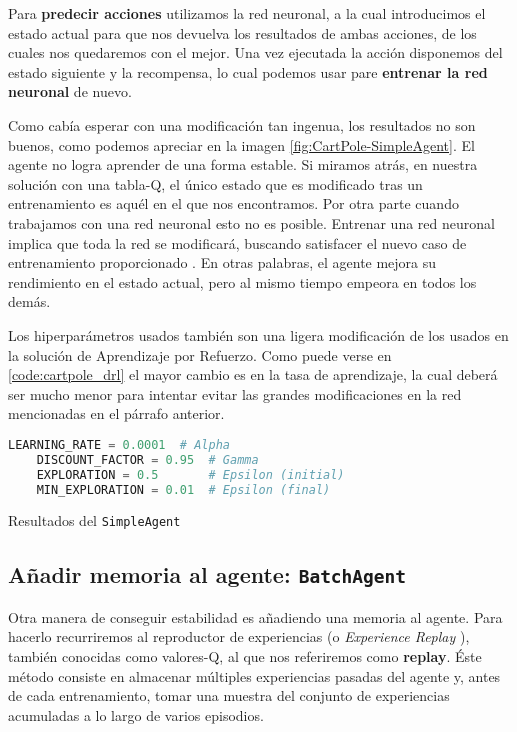 Para \textbf{predecir acciones} utilizamos la red neuronal, a la cual introducimos el estado actual para que nos devuelva los resultados de ambas acciones, de los cuales nos quedaremos con el mejor. Una vez ejecutada la acción disponemos del estado siguiente y la recompensa, lo cual podemos usar pare \textbf{entrenar la red neuronal} de nuevo.

Como cabía esperar con una modificación tan ingenua, los resultados no son buenos, como podemos apreciar en la imagen \ref{fig:CartPole-SimpleAgent}. El agente no logra aprender de una forma estable. Si miramos atrás, en nuestra solución con una tabla-Q, el único estado que es modificado tras un entrenamiento es aquél en el que nos encontramos. Por otra parte cuando trabajamos con una red neuronal esto no es posible. Entrenar una red neuronal implica que toda la red se modificará, buscando satisfacer el nuevo caso de entrenamiento proporcionado \citep{Buduma:backprop}. En otras palabras, el agente mejora su rendimiento en el estado actual, pero al mismo tiempo empeora en todos los demás.

Los hiperparámetros usados también son una ligera modificación de los usados en la solución de Aprendizaje por Refuerzo. Como puede verse en \ref{code:cartpole_drl} el mayor cambio es en la tasa de aprendizaje, la cual deberá ser mucho menor para intentar evitar las grandes modificaciones en la red mencionadas en el párrafo anterior.

\begin{minipage}{0.9\linewidth}%
    \begin{lstlisting}[frame=tb, language=Python, caption=Hiperparámetros, label=code:cartpole_drl]
    LEARNING_RATE = 0.0001  # Alpha
    DISCOUNT_FACTOR = 0.95  # Gamma
    EXPLORATION = 0.5       # Epsilon (initial)
    MIN_EXPLORATION = 0.01  # Epsilon (final)
    \end{lstlisting}%
\end{minipage}

%
       {Resultados del \texttt{SimpleAgent}}

\subsection{Añadir memoria al agente: \texttt{BatchAgent}}

Otra manera de conseguir estabilidad es añadiendo una memoria al agente. Para hacerlo recurriremos al reproductor de experiencias (o \textit{Experience Replay} \citep{Lin1992}), también conocidas como valores-Q, al que nos referiremos como \textbf{replay}. Éste método consiste en almacenar múltiples experiencias pasadas del agente y, antes de cada entrenamiento, tomar una muestra del conjunto de experiencias acumuladas a lo largo de varios episodios.

